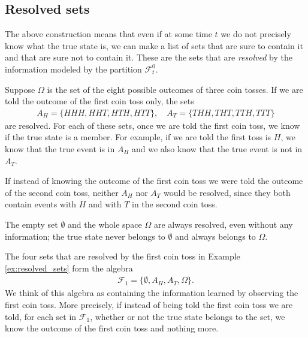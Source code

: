 \documentclass[\topdir/lecture\_notes.tex]{subfiles}
\begin{document}
\begin{optional}
\subsection{Resolved sets}
The above construction means that even if at some time \(t\) we do not precisely know what the true state is, we can make a list of sets that are sure to contain it and that are sure not to contain it. These are the sets that are \emph{resolved} by the information modeled by the partition \(\mathcal{F}_{t}^{0}\).

\begin{example}\label{ex:resolved_sets}
Suppose \(\Omega\) is the set of the eight possible outcomes of three coin tosses. If we are told the outcome of the first coin toss only, the sets
\begin{align*}
A_{H}=\{H H H, H H T, H T H, H T T\}, \quad A_{T}=\{T H H, T H T, T T H, T T T\}
\end{align*}
are resolved. For each of these sets, once we are told the first coin toss, we know if the true state is a member. For example, if we are told the first toss is \(H\), we know that the true event is in \(A_{H}\) and we also know that the true event is not in \(A_{T}\).

If instead of knowing the outcome of the first coin toss we were told the outcome of the second coin toss, neither \(A_{H}\) nor \(A_{T}\) would be resolved, since they both contain events with \(H\) and with \(T\) in the second coin toss.
\end{example}

The empty set \(\emptyset\) and the whole space \(\Omega\) are always resolved, even without any information; the true state never belongs to \(\emptyset\) and always belongs to \(\Omega\). 

\begin{example}
The four sets that are resolved by the first coin toss in Example \ref{ex:resolved_sets} form the algebra
\begin{align*}
\mathcal{F}_{1}=\{\emptyset, A_{H}, A_{T}, \Omega \}.
\end{align*}
We think of this algebra as containing the information learned by observing the first coin toss. More precisely, if instead of being told the first coin toss we are told, for each set in \(\mathcal{F}_{1}\), whether or not the true state belongs to the set, we know the outcome of the first coin toss and nothing more.


\end{example}
\end{optional}
\end{document}
